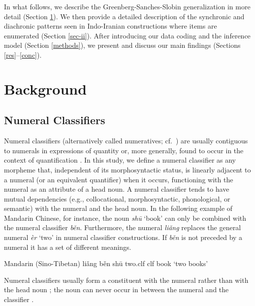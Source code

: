 \documentclass[11pt]{article}
\begin{document}
In what follows, we describe the Greenberg-Sanches-Slobin generalization in more detail (Section \ref{background}). We then provide a detailed description of the synchronic and diachronic patterns seen in Indo-Iranian constructions where items are enumerated (Section \ref{sec-ii}). After introducing our data coding and the inference model (Section \ref{methods}), we present and discuss our main findings (Sections \ref{res}--\ref{conc}).


\section{Background}
\label{background}

\subsection{Numeral Classifiers}
Numeral classifiers (alternatively called numeratives; cf.\ \citealt[98]{Aikhenvald2000}) are usually contiguous to numerals in expressions of quantity or, more generally, found to occur in the context of quantification \citep[63]{Grinevald2000}.
In this study, we define a numeral classifier as any morpheme that, independent of its morphosyntactic status, is linearly adjacent to a numeral (or an equivalent quantifier) when it occurs, %
functioning with the numeral as an attribute of a head noun. A numeral classifier tends to have mutual dependencies (e.g., collocational, morphosyntactic, phonological, or semantic) with the numeral and the head noun. In the following example of Mandarin Chinese, for instance, the noun {\it sh\=u} `book' can only be combined with the numeral classifier {\it b\v{e}n}. Furthermore, the numeral {\it li\v{a}ng} replaces the general numeral {\it \`er} `two' in numeral classifier constructions. If {\it b\v{e}n} is not preceded by a numeral it has a set of different meanings.
\begin{example} Mandarin (Sino-Tibetan)
\gll li\v{a}ng b\v{e}n sh\=u
two.{\sc clf} {\sc clf} book
\glt `two books'
\glend
\end{example}
Numeral classifiers usually form a constituent with the numeral rather than with the head noun \citep[e.g.,][105]{Aikhenvald2000}; the noun can never occur in between the numeral and the classifier \citep{Her2017}.
\end{document}
